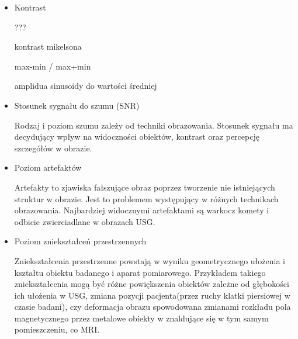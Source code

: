\begin{itemize}
    \item Kontrast

          ???

          kontrast mikelsona

          max-min / max+min

          amplidua sinusoidy do wartości średniej


    \item Stosunek sygnału do szumu (SNR)

          Rodzaj i poziom szumu zależy od techniki obrazowania.
          Stosunek sygnału ma decydujący wpływ na widoczności obiektów, kontrast oraz percepcję szczegółów w obrazie.

    \item Poziom artefaktów

          Artefakty to zjawiska fałszujące obraz poprzez tworzenie nie istniejących struktur w obrazie.
          Jest to problemem występujący w różnych technikach obrazowania.
          Najbardziej widocznymi artefaktami są warkocz komety i odbicie zwierciadlane w obrazach USG.

    \item Poziom zniekształceń przestrzennych

          Zniekształcenia przestrzenne powstają w wyniku geometrycznego ułożenia i kształtu obiektu badanego i aparat pomiarowego.
          Przykładem takiego zniekształcenia mogą być różne powiększenia obiektów zależne od głębokości ich ułożenia w USG, zmiana pozycji pacjenta(przez ruchy klatki piersiowej w czasie badani), czy deformacja obrazu spowodowana zmianami rozkładu pola magnetycznego przez metalowe obiekty w znaldujące się w tym samym pomieszczeniu, co MRI.

\end{itemize}